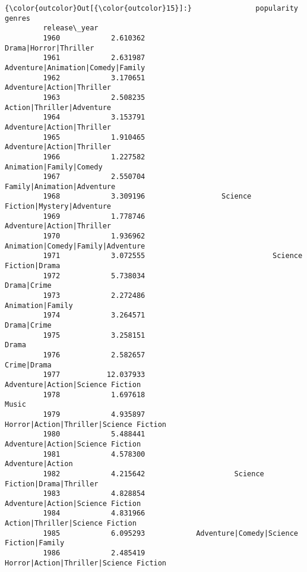 \documentclass[11pt]{article}
\begin{document}
\begin{Verbatim}[commandchars=\\\{\}]
{\color{outcolor}Out[{\color{outcolor}15}]:}               popularity                                             genres
         release\_year                                                               
         1960            2.610362                              Drama|Horror|Thriller
         1961            2.631987                  Adventure|Animation|Comedy|Family
         1962            3.170651                          Adventure|Action|Thriller
         1963            2.508235                          Action|Thriller|Adventure
         1964            3.153791                          Adventure|Action|Thriller
         1965            1.910465                          Adventure|Action|Thriller
         1966            1.227582                            Animation|Family|Comedy
         1967            2.550704                         Family|Animation|Adventure
         1968            3.309196                  Science Fiction|Mystery|Adventure
         1969            1.778746                          Adventure|Action|Thriller
         1970            1.936962                  Animation|Comedy|Family|Adventure
         1971            3.072555                              Science Fiction|Drama
         1972            5.738034                                        Drama|Crime
         1973            2.272486                                   Animation|Family
         1974            3.264571                                        Drama|Crime
         1975            3.258151                                              Drama
         1976            2.582657                                        Crime|Drama
         1977           12.037933                   Adventure|Action|Science Fiction
         1978            1.697618                                              Music
         1979            4.935897             Horror|Action|Thriller|Science Fiction
         1980            5.488441                   Adventure|Action|Science Fiction
         1981            4.578300                                   Adventure|Action
         1982            4.215642                     Science Fiction|Drama|Thriller
         1983            4.828854                   Adventure|Action|Science Fiction
         1984            4.831966                    Action|Thriller|Science Fiction
         1985            6.095293            Adventure|Comedy|Science Fiction|Family
         1986            2.485419             Horror|Action|Thriller|Science Fiction

\end{Verbatim}
\end{document}
